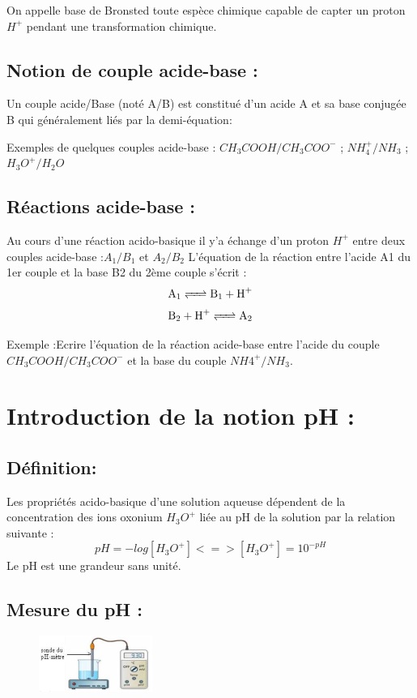 \documentclass[12pt]{article}
\begin{document}
On appelle base de Bronsted toute espèce chimique capable de capter un proton $H^+$ pendant une transformation chimique.


\subsection{Notion de couple acide-base : }
Un couple acide/Base (noté A/B) est constitué d'un acide A et sa base conjugée B qui généralement liés par la demi-équation: 

Exemples de quelques couples acide-base : $CH_3COOH/CH_3COO^-$ ; $NH_4^+/NH_3$ ; $H_3O^+/H_2O$

\subsection{Réactions acide-base :}
Au cours d’une réaction acido-basique il y’a échange d'un proton $H^+$  entre deux couples acide-base :$A_1/B_1$ et $A_2/B_2$
L'équation de la réaction entre l'acide A1 du 1er couple et la base B2 du 2ème couple s'écrit :$$\ce{A_1 <=>B_1 + H^+}$$
$$\ce{B_2 + H^+ <=>A_2}$$

Exemple :Ecrire l'équation de la réaction acide-base entre l'acide du couple $CH_3COOH/CH_3COO^-$ et la base du couple $NH4^+/NH_3$.

\section{Introduction de la notion pH : }

\subsection{Définition:}
Les propriétés acido-basique d'une solution aqueuse dépendent de la concentration des ions oxonium $H_3O^+$ liée au pH de la solution par la relation suivante : $$pH = -log[H_3O^+]  <=> [H_3O^+] = 10^{-pH}$$
Le pH est une grandeur sans unité.

\subsection{Mesure du pH : }

\begin{figure}
	\includegraphics[width=0.33\textwidth]{./img/phMesure.png}
\end{figure}
\end{document}
